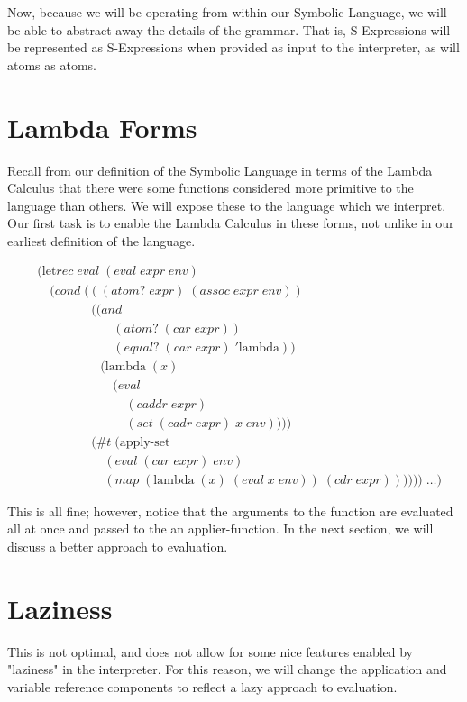 Now, because we will be operating from within our Symbolic Language, we will 
be able to abstract away the details of the grammar. That is, S-Expressions 
will be represented as S-Expressions when provided as input to the 
interpreter, as will atoms as atoms.

\section{Lambda Forms}
Recall from our definition of the Symbolic Language in terms of the Lambda 
Calculus that there were some functions considered more primitive to the 
language than others. We will expose these to the language which we 
interpret. Our first task is to enable the Lambda Calculus in these forms, 
not unlike in our earliest definition of the language.

\begin{align*}
& (\text{let}rec \; eval \; (eval \; expr \; env)
\\& \quad (cond \; (((atom? \; expr) \; (assoc \; expr \; env))
\\& \qquad \qquad \; ((and \; 
\\& \qquad \qquad \qquad (atom? \; (car \; expr)) \; 
\\& \qquad \qquad \qquad (equal? \; (car \; expr) \; '\text{lambda})) \; 
\\& \qquad \qquad \quad (\text{lambda} \; (x) \; 
\\& \qquad \qquad \qquad (eval \; 
\\& \qquad \qquad \qquad \quad (caddr \; expr) \; 
\\& \qquad \qquad \qquad \quad (set \; (cadr \; expr) \; x \; env))))
\\& \qquad \qquad \; (\#t \; (\text{apply-set} \; 
\\& \qquad \qquad \quad \; (eval \; (car \; expr) \; env) \; 
\\& \qquad \qquad \quad \; (map \; (\text{lambda} \; (x) \; (eval \; x \; env)) \; (cdr \; expr)))))) \; \dots)
\end{align*}

This is all fine; however, notice that the arguments to the function are evaluated all at once and passed to the an applier-function. In the next section, we will discuss a better approach to evaluation.

\section{Laziness}
This is not optimal, and does not allow for some nice features enabled by "laziness" in the interpreter. For this reason, we will change the application and variable reference components to reflect a lazy approach to evaluation.

